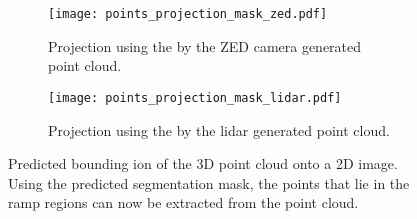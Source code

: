\begin{figure}[htb]
    \centering
    \begin{subfigure}{1\textwidth}
        \centering
        \texttt{[image: points\_projection\_mask\_zed.pdf]}
        \caption{Projection using the by the ZED camera generated point cloud.}
        \label{fig:points_projection_mask_zed}
    \end{subfigure}
    
    \begin{subfigure}{1\textwidth}
        \centering
        \texttt{[image: points\_projection\_mask\_lidar.pdf]}
        \caption{Projection using the by the \acrshort{lidar} generated point cloud.}
        \label{fig:points_projection_mask_lidar}
    \end{subfigure}
    \caption[Point cloud extraction using the predicted segmentation mask]{Predicted bounding ion of the 3D point cloud onto a 2D image. Using the predicted segmentation mask, the points that lie in the ramp regions can now be extracted from the point cloud.}
\end{figure}
\begin{table}[H]
    \centering
    \caption[Ramp length]{Estimation of different ramp properties using the extracted point cloud.}
    \label{tab:cloud_extraction_estimation}
\end{table}